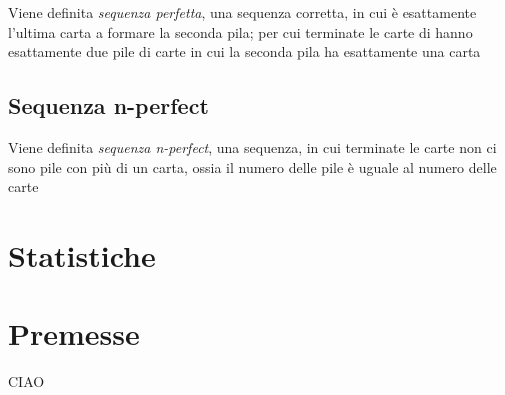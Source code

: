 \documentclass[a4paper]{article}
\begin{document}
Viene definita \emph{sequenza perfetta}, una sequenza corretta, in cui è esattamente l'ultima carta a formare la seconda pila; per cui terminate le carte di hanno esattamente due pile di carte in cui la seconda pila ha esattamente una carta




\subsection{Sequenza n-perfect}

Viene definita \emph{sequenza n-perfect}, una sequenza, in cui terminate le carte non ci sono pile con più di un carta, ossia il numero delle pile è uguale al numero delle carte



\newpage

\section{Statistiche}



\section{Premesse}

CIAO
\end{document}
